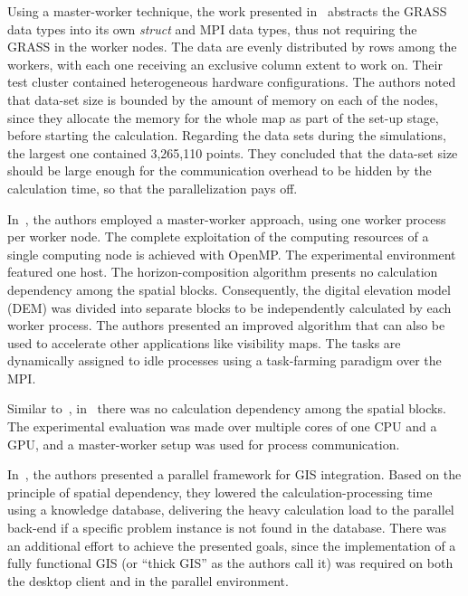 Using a master-worker technique, the work presented in~\cite{Huang-Explorations_of_the_implementation_of_a_parallel_IDW_algorithm_in_a_Linux_cluster:2011}
abstracts the GRASS data types into its own \emph{struct} and MPI
data types, thus not requiring the GRASS in the worker nodes. The
data are evenly distributed by rows among the workers, with each one
receiving an exclusive column extent to work on. Their test cluster
contained heterogeneous hardware configurations. The authors noted
that data-set size is bounded by the amount of memory on each of the
nodes, since they allocate the memory for the whole map as part of
the set-up stage, before starting the calculation. Regarding the data
sets during the simulations, the largest one contained 3,265,110 points.
They concluded that the data-set size should be large enough for the
communication overhead to be hidden by the calculation time, so that
the parallelization pays off.

In~\cite{Tabik-High_performance_three_horizon_composition_algorithm_for_large_scale_terrains:2011},
the authors employed a master-worker approach, using one worker process
per worker node. The complete exploitation of the computing resources
of a single computing node is achieved with OpenMP. The experimental
environment featured one host. The horizon-composition algorithm presents
no calculation dependency among the spatial blocks. Consequently,
the digital elevation model (DEM)
was divided into separate blocks to be independently calculated by
each worker process. The authors presented an improved algorithm that
can also be used to accelerate other applications like visibility
maps. The tasks are dynamically assigned to idle processes using a
task-farming paradigm over the MPI. 

Similar to~\cite{Tabik-High_performance_three_horizon_composition_algorithm_for_large_scale_terrains:2011},
in~\cite{Tabik-Optimal_tilt_and_orientation_maps_a_multi_algorithm_approach_for_heterogeneous_multicore_GPU_systems:2013}
there was no calculation dependency among the spatial blocks. The
experimental evaluation was made over multiple cores of one CPU and
a GPU, and a master-worker setup was used for process communication.

In~\cite{Yin_A_framework_for_integrating_GIS_and_parallel_computing_for_spatial_control_problems_a_case_study_of_wildfire_dontrol:2012},
the authors presented a parallel framework for GIS integration. Based
on the principle of spatial dependency, they lowered the calculation-processing
time using a knowledge database, delivering the heavy calculation
load to the parallel back-end if a specific problem instance is not
found in the database. There was an additional effort to achieve the
presented goals, since the implementation of a fully functional GIS
(or ``thick GIS'' as the authors call it) was required on both the
desktop client and in the parallel environment.

